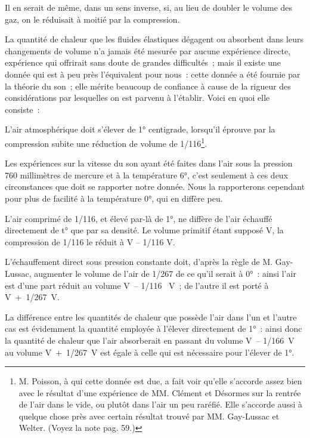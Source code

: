 \documentclass[french,twoside]{book} %
\begin{document}
Il en serait de même, dans un sens inverse, si, au lieu de doubler le volume des gaz, on le réduisait à moitié par la compression.\par
La quantité de chaleur que les fluides élastiques dégagent ou absorbent dans leurs changements de volume n’a jamais été mesurée par aucune expérience directe, expérience qui offrirait sans doute de grandes difficultés ; mais il existe une donnée qui est à peu près l’équivalent pour nous : cette donnée a été fournie par la théorie du son ; elle mérite beaucoup de confiance à cause de la rigueur des considérations par lesquelles on est parvenu à l’établir. Voici en quoi elle consiste :\par
L’air atmosphérique doit s’élever de 1° centigrade, lorsqu’il éprouve par la compression subite une réduction de volume de 1/116\footnote{M. Poisson, à qui cette donnée est due, a fait voir qu’elle s’accorde assez bien avec le résultat d’une expérience de MM. Clément et Désormes sur la rentrée de l’air dans le vide, ou plutôt dans l’air un peu raréfié. Elle s’accorde aussi à quelque chose près avec certain résultat trouvé par MM. Gay-Lussac et Welter. (Voyez la note pag. 59.)}.\par
Les expériences sur la vitesse du son ayant été faites dans l’air sous la pression 760 millimètres de mercure et à la température 6°, c’est seulement à ces deux circonstances que doit se rapporter notre donnée. Nous la rapporterons cependant pour plus de facilité à la température 0°, qui en diffère peu.\par
L’air comprimé de 1/116, et élevé par-là de 1°, ne diffère de l’air échauffé directement de t° que par sa densité. Le volume primitif étant supposé V, la compression de 1/116 le réduit à V – 1/116 V.\par
L’échauffement direct sous pression constante doit, d’après la règle de M. Gay-Lussac, augmenter le volume de l’air de 1/267 de ce qu’il serait à 0° : ainsi l’air est d’une part réduit au volume V – 1/116  V ; de l’autre il est porté à V + 1/267 V.\par
La différence entre les quantités de chaleur que possède l’air dans l’un et l’autre cas est évidemment la quantité employée à l’élever directement de 1° : ainsi donc la quantité de chaleur que l’air absorberait en passant du volume V – 1/166 V au volume V + 1/267 V est égale à celle qui est nécessaire pour l’élever de 1°.\par
\end{document}

